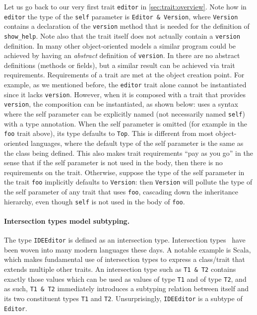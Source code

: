 Let us go back to our very first trait \lstinline{editor} in
\cref{sec:trait:overview}. Note how in \lstinline{editor} the type of the
\lstinline{self} parameter is \lstinline{Editor & Version}, where
\lstinline{Version} contains a declaration of the \lstinline{version} method
that is needed for the definition of \lstinline{show_help}. Note also that the
trait itself does not actually contain a \lstinline{version} definition. In many
other object-oriented models a similar program could be achieved by having an \emph{abstract}
definition of \lstinline{version}. In \sedel there are no abstract definitions
(methods or fields), but a similar result can be achieved via trait
requirements. Requirements of a trait are met at the object creation point. For
example, as we mentioned before, the \lstinline{editor} trait alone cannot be
instantiated since it lacks \lstinline{version}. However, when it is composed
with a trait that provides \lstinline{version}, the composition can be
instantiated, as shown below:
\sedel uses a syntax where the self parameter can be explicitly named (not
necessarily named \lstinline{self}) with a type annotation. When the self
parameter is omitted (for example in the \lstinline{foo} trait above), its type
defaults to \lstinline{Top}. This is different from most object-oriented languages, where
the default type of the self parameter is the same as the class being defined.
This also makes trait requirements ``pay as you go'' in the sense that if the
self parameter is not used in the body, then there is no requirements on the
trait. Otherwise, suppose the type of the self parameter in the trait
\lstinline{foo} implicitly defaults to \lstinline{Version}:
then \lstinline{Version} will pollute the type of the self parameter of any trait that
uses \lstinline{foo}, cascading down the inheritance hierarchy, even though \lstinline{self}
is not used in the body of \lstinline{foo}.



\paragraph{Intersection types model subtyping.}

The type \lstinline{IDEEditor} is defined as an intersection type.
Intersection types~\citep{coppo1981functional,pottinger1980type} have been woven
into many modern languages these days. A notable example is Scala, which makes
fundamental use of intersection types to express a class/trait that extends
multiple other traits. An intersection type such as \lstinline{T1 & T2} contains
exactly those values which can be used as values of type \lstinline{T1} and of
type \lstinline{T2}, and as such, \lstinline{T1 & T2} immediately introduces a
subtyping relation between itself and its two constituent types \lstinline{T1}
and \lstinline{T2}. Unsurprisingly, \lstinline{IDEEditor} is a subtype of
\lstinline{Editor}.


